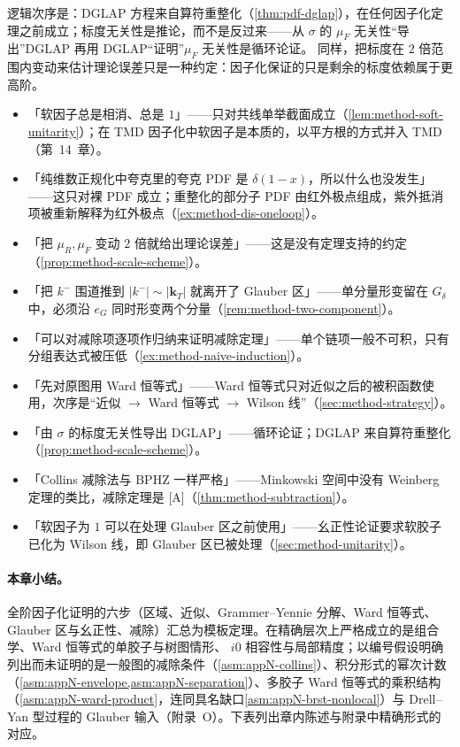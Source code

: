 逻辑次序是：DGLAP 方程来自算符重整化（\cref{thm:pdf-dglap}），在任何因子化定理之前成立；标度无关性是推论，而不是反过来——从 $\sigma$ 的 $\mu_F$ 无关性“导出”DGLAP 再用 DGLAP“证明”$\mu_F$ 无关性是循环论证。
同样，把标度在 $2$ 倍范围内变动来估计理论误差只是一种约定：因子化保证的只是剩余的标度依赖属于更高阶。

\begin{tcolorbox}[enhanced,breakable,title=本章涉及的常见误解,fonttitle=\bfseries,
  colback=gray!3!white,colframe=gray!55!black,boxrule=0.6pt,arc=2pt,
  left=5pt,right=5pt,top=3pt,bottom=3pt,before skip=6pt,after skip=6pt]
\begin{itemize}[leftmargin=1.2em,itemsep=1pt,topsep=1pt]
\item 「软因子总是相消、总是 $1$」——只对共线单举截面成立（\cref{lem:method-soft-unitarity}）；在 TMD 因子化中软因子是本质的，以平方根的方式并入 TMD（第~14~章）。
\item 「纯维数正规化中夸克里的夸克 PDF 是 $\delta(1-x)$，所以什么也没发生」——这只对裸 PDF 成立；重整化的部分子 PDF 由红外极点组成，紫外抵消项被重新解释为红外极点（\cref{ex:method-dis-oneloop}）。
\item 「把 $\mu_R,\mu_F$ 变动 $2$ 倍就给出理论误差」——这是没有定理支持的约定（\cref{prop:method-scale-scheme}）。
\item 「把 $k^-$ 围道推到 $|k^-|\sim|\mathbf k_T|$ 就离开了 Glauber 区」——单分量形变留在 $G_\delta$ 中，必须沿 $e_G$ 同时形变两个分量（\cref{rem:method-two-component}）。
\item 「可以对减除项逐项作归纳来证明减除定理」——单个链项一般不可积，只有分组表达式被压低（\cref{ex:method-naive-induction}）。
\item 「先对原图用 Ward 恒等式」——Ward 恒等式只对近似之后的被积函数使用，次序是“近似 $\to$ Ward 恒等式 $\to$ Wilson 线”（\cref{sec:method-strategy}）。
\item 「由 $\sigma$ 的标度无关性导出 DGLAP」——循环论证；DGLAP 来自算符重整化（\cref{prop:method-scale-scheme}）。
\item 「Collins 减除法与 BPHZ 一样严格」——Minkowski 空间中没有 Weinberg 定理的类比，减除定理是 [A]（\cref{thm:method-subtraction}）。
\item 「软因子为 $1$ 可以在处理 Glauber 区之前使用」——幺正性论证要求软胶子已化为 Wilson 线，即 Glauber 区已被处理（\cref{sec:method-unitarity}）。
\end{itemize}
\end{tcolorbox}

\paragraph{本章小结。}全阶因子化证明的六步（区域、近似、Grammer--Yennie 分解、Ward 恒等式、Glauber 区与幺正性、减除）汇总为模板定理。在精确层次上严格成立的是组合学、Ward 恒等式的单胶子与树图情形、
$i0$ 相容性与局部精度；以编号假设明确列出而未证明的是一般图的减除条件（\cref{asm:appN-collins}）、积分形式的幂次计数（\cref{asm:appN-envelope,asm:appN-separation}）、多胶子 Ward 恒等式的乘积结构
（\cref{asm:appN-ward-product}，连同具名缺口\cref{asm:appN-brst-nonlocal}）与 Drell--Yan 型过程的 Glauber 输入（附录~O）。下表列出章内陈述与附录中精确形式的对应。

